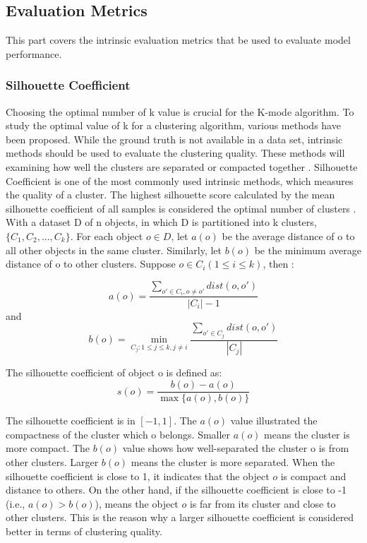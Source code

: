 \documentclass{article}
\begin{document}
\subsection{Evaluation Metrics} \label{evaluation metrics}
This part covers the intrinsic evaluation metrics that be used to evaluate model performance.

\subsubsection{Silhouette Coefficient}

\noindent Choosing the optimal number of k value is crucial for the 
K-mode algorithm. To study the optimal value of k for a clustering algorithm, 
various methods have been proposed. While the ground truth is not available
in a data set, intrinsic methods should be used to evaluate the 
clustering quality. These methods will examining how well the clusters
are separated or compacted together \citep{2012vi}. Silhouette Coefficient is one of the most
commonly used intrinsic methods, which measures the quality of a cluster. The highest
silhouette score calculated by the mean silhouette coefficient of all samples
is considered the optimal number of clusters \citep{9260048}. \\

\noindent With a dataset D of n objects, in which D is partitioned into 
k clusters, $\{C_1,C_2,...,C_k\}$. For each object $o \in D$, 
let $a(o)$ be the average distance of o to all other objects in the same cluster.
Similarly, let $b(o)$ be the minimum average distance of o to other clusters.
Suppose $o \in C_i(1 \leq i \leq k )$, then \citep{2012vi}: 

$$a(o) = \frac{\sum_{o' \in C_i , o \neq o'} dist(o,o')}{|C_i| - 1}$$
and
$$b(o) = \min_{C_j: 1 \leq j \leq k, j \neq i} \frac{\sum_{o' \in C_j} dist(o,o')}{|C_j|}$$

The silhouette coefficient of object o is defined as:
$$s(o) = \frac{b(o) - a(o)}{\max\{a(o),b(o)\}}$$

\pagebreak

\noindent The silhouette coefficient is in $[-1,1]$. The $a(o)$ value illustrated
the compactness of the cluster which o belongs. Smaller $a(o)$ means the
cluster is more compact. The $b(o)$ value shows how well-separated the 
cluster o is from other clusters. Larger $b(o)$ means the cluster is
more separated. When the silhouette coefficient is close to 1, it indicates
that the object $o$ is compact and distance to others. On the other hand, 
if the silhouette coefficient is close to -1 (i.e., $a(o) > b(o)$), means
the object $o$ is far from its cluster and close to other clusters. This is
the reason why a larger silhouette coefficient is considered better in terms of
clustering quality. 
\end{document}
